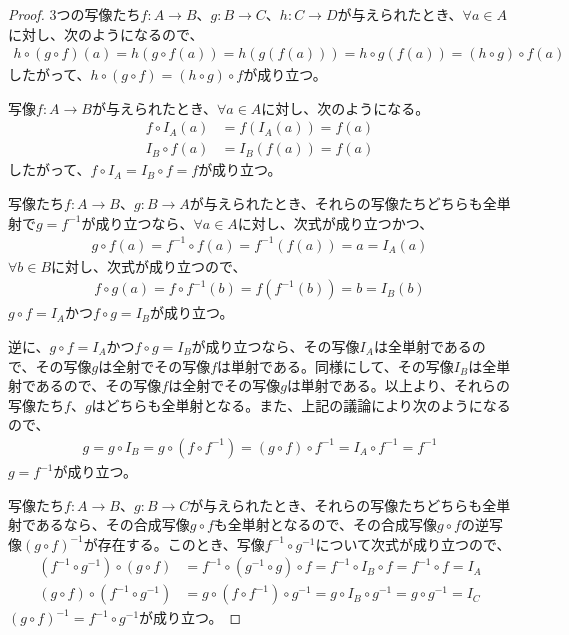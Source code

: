 \documentclass[dvipdfmx]{jsarticle}
\begin{document}
\begin{proof}
3つの写像たち$f:A \rightarrow B$、$g:B \rightarrow C$、$h:C \rightarrow D$が与えられたとき、$\forall a \in A$に対し、次のようになるので、
\begin{align*}
h \circ (g \circ f)(a) = h\left( g \circ f(a) \right) = h\left( g\left( f(a) \right) \right) = h \circ g\left( f(a) \right) = (h \circ g) \circ f(a)
\end{align*}
したがって、$h \circ (g \circ f) = (h \circ g) \circ f$が成り立つ。\par
写像$f:A \rightarrow B$が与えられたとき、$\forall a \in A$に対し、次のようになる。
\begin{align*}
f \circ I_{A}(a) &= f\left( I_{A}(a) \right) = f(a)\\
I_{B} \circ f(a) &= I_{B}\left( f(a) \right) = f(a)
\end{align*}
したがって、$f \circ I_{A} = I_{B} \circ f = f$が成り立つ。\par
写像たち$f:A \rightarrow B$、$g:B \rightarrow A$が与えられたとき、それらの写像たちどちらも全単射で$g = f^{- 1}$が成り立つなら、$\forall a \in A$に対し、次式が成り立つかつ、
\begin{align*}
g \circ f(a) = f^{- 1} \circ f(a) = f^{- 1}\left( f(a) \right) = a = I_{A}(a)
\end{align*}
$\forall b \in B$に対し、次式が成り立つので、
\begin{align*}
f \circ g(a) = f \circ f^{- 1}(b) = f\left( f^{- 1}(b) \right) = b = I_{B}(b)
\end{align*}
$g \circ f = I_{A}$かつ$f \circ g = I_{B}$が成り立つ。\par
逆に、$g \circ f = I_{A}$かつ$f \circ g = I_{B}$が成り立つなら、その写像$I_{A}$は全単射であるので、その写像$g$は全射でその写像$f$は単射である。同様にして、その写像$I_{B}$は全単射であるので、その写像$f$は全射でその写像$g$は単射である。以上より、それらの写像たち$f$、$g$はどちらも全単射となる。また、上記の議論により次のようになるので、
\begin{align*}
g = g \circ I_{B} = g \circ \left( f \circ f^{- 1} \right) = (g \circ f) \circ f^{- 1} = I_{A} \circ f^{- 1} = f^{- 1}
\end{align*}
$g = f^{- 1}$が成り立つ。\par
写像たち$f:A \rightarrow B$、$g:B \rightarrow C$が与えられたとき、それらの写像たちどちらも全単射であるなら、その合成写像$g \circ f$も全単射となるので、その合成写像$g \circ f$の逆写像$(g \circ f)^{- 1}$が存在する。このとき、写像$f^{- 1} \circ g^{- 1}$について次式が成り立つので、
\begin{align*}
\left( f^{- 1} \circ g^{- 1} \right) \circ (g \circ f) &= f^{- 1} \circ \left( g^{- 1} \circ g \right) \circ f = f^{- 1} \circ I_{B} \circ f = f^{- 1} \circ f = I_{A}\\
(g \circ f) \circ \left( f^{- 1} \circ g^{- 1} \right) &= g \circ \left( f \circ f^{- 1} \right) \circ g^{- 1} = g \circ I_{B} \circ g^{- 1} = g \circ g^{- 1} = I_{C}
\end{align*}
$(g \circ f)^{- 1} = f^{- 1} \circ g^{- 1}$が成り立つ。
\end{proof}
\end{document}
